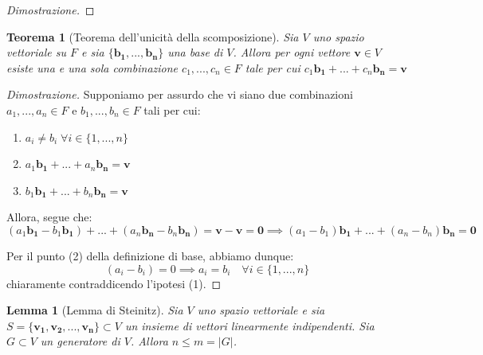 \documentclass{article}
\newtheorem{theorem}{Teorema}
\newtheorem{lemma}{Lemma}
\begin{document}
\begin{proof}[Dimostrazione]
        \vspace{10pt}

    \end{proof}

    \vspace{10pt}
    \begin{theorem}[Teorema dell'unicità della scomposizione]
        Sia $V$ uno spazio vettoriale su $F$ e sia $\{\mathbf{b_1},...,\mathbf{b_n}\}$ una base di $V$. 
        Allora per ogni vettore $\mathbf{v} \in V$ esiste una e una sola combinazione $c_1,...,c_n \in F$ tale per cui $c_1\mathbf{b_1} + ... + c_n\mathbf{b_n} = \mathbf{v}$
    \end{theorem}

    \begin{proof}[Dimostrazione]
        Supponiamo per assurdo che vi siano due combinazioni $a_1,...,a_n \in F$ e $b_1,...,b_n \in F$ tali per cui: 
        \begin{enumerate}[label=(\arabic*)]
            \item $a_i \neq b_i \; \forall i \in \{1,...,n\}$
            \item $a_1\mathbf{b_1} + ... + a_n\mathbf{b_n} = \mathbf{v}$ 
            \item $b_1\mathbf{b_1} + ... + b_n\mathbf{b_n} = \mathbf{v}$ 
        \end{enumerate} 

        Allora, segue che:
        \[
            (a_1\mathbf{b_1} - b_1\mathbf{b_1}) + ... + (a_n\mathbf{b_n} - b_n\mathbf{b_n}) = \mathbf{v} - \mathbf{v} = \mathbf{0} \implies (a_1 - b_1) \mathbf{b_1} + ... + (a_n - b_n) \mathbf{b_n} = \mathbf{0} 
        \]

        Per il punto (2) della definizione di base, abbiamo dunque:
        \[
            (a_i - b_i) = 0 \implies a_i = b_i \quad \forall i \in \{1,...,n\}
        \]
        chiaramente contraddicendo l'ipotesi (1).
    \end{proof}

    \vspace{10pt}
    \begin{lemma}[Lemma di Steinitz]
        Sia $V$ uno spazio vettoriale e sia $S = \{\mathbf{v_1}, \mathbf{v_2}, ..., \mathbf{v_n}\} \subset V$ un insieme di vettori linearmente indipendenti. Sia $G \subset V$ un generatore di $V$. Allora $n \leq m = |G|$.
    \end{lemma}
\end{document}

